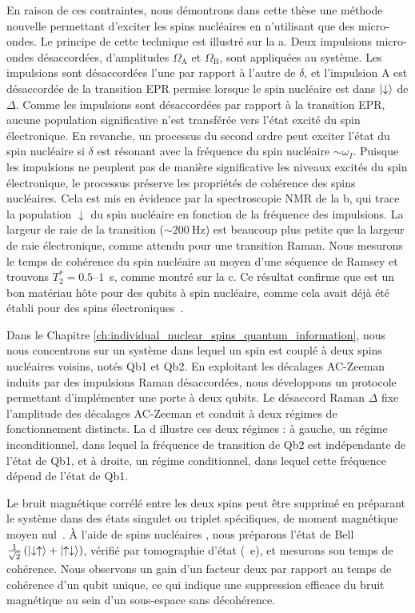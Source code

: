 En raison de ces contraintes, nous démontrons dans cette thèse une méthode nouvelle permettant d'exciter les spins nucléaires en n'utilisant que des micro-ondes. Le principe de cette technique est illustré sur la a. Deux impulsions micro-ondes désaccordées, d'amplitudes $\Omega_\text{A}$ et $\Omega_\text{B}$, sont appliquées au système. Les impulsions sont désaccordées l'une par rapport à l'autre de $\delta$, et l'impulsion A est désaccordée de la transition EPR permise lorsque le spin nucléaire est dans $\ket{\downarrow}$ de $\Delta$. Comme les impulsions sont désaccordées par rapport à la transition EPR, aucune population significative n'est transférée vers l'état excité du spin électronique. En revanche, un processus du second ordre peut exciter l'état du spin nucléaire si $\delta$ est résonant avec la fréquence du spin nucléaire $\sim\omega_I$. Puisque les impulsions ne peuplent pas de manière significative les niveaux excités du spin électronique, le processus préserve les propriétés de cohérence des spins nucléaires. Cela est mis en évidence par la spectroscopie NMR de la b, qui trace la population $\downarrow$ du spin nucléaire en fonction de la fréquence des impulsions. La largeur de raie de la transition ($\sim200~\mathrm{Hz}$) est beaucoup plus petite que la largeur de raie électronique, comme attendu pour une transition Raman. Nous mesurons le temps de cohérence du spin nucléaire au moyen d'une séquence de Ramsey et trouvons $T_2^*=0.5$--$1$~s, comme montré sur la c. Ce résultat confirme que \Ca est un bon matériau hôte pour des qubits à spin nucléaire, comme cela avait déjà été établi pour des spins électroniques~.

Dans le Chapitre \ref{ch:individual_nuclear_spins_quantum_information}, nous nous concentrons sur un système dans lequel un spin \Er est couplé à deux spins nucléaires \W voisins, notés Qb1 et Qb2. En exploitant les décalages AC-Zeeman induits par des impulsions Raman désaccordées, nous développons un protocole permettant d'implémenter une porte à deux qubits. Le désaccord Raman $\Delta$ fixe l'amplitude des décalages AC-Zeeman et conduit à deux régimes de fonctionnement distincts. La d illustre ces deux régimes : à gauche, un régime inconditionnel, dans lequel la fréquence de transition de Qb2 est indépendante de l'état de Qb1, et à droite, un régime conditionnel, dans lequel cette fréquence dépend de l'état de Qb1.

Le bruit magnétique corrélé entre les deux spins peut être supprimé en préparant le système dans des états singulet ou triplet spécifiques, de moment magnétique moyen nul~\cite{bartling_entanglement_2022, bradley_tenqubit_2019}. À l'aide de spins nucléaires \W, nous préparons l'état de Bell $\tfrac{1}{\sqrt2}\left(\ket{\downarrow\uparrow}+\ket{\uparrow\downarrow}\right)$, vérifié par tomographie d'état (~e), et mesurons son temps de cohérence. Nous observons un gain d'un facteur deux par rapport au temps de cohérence d'un qubit unique, ce qui indique une suppression efficace du bruit magnétique au sein d'un sous-espace sans décohérence.

